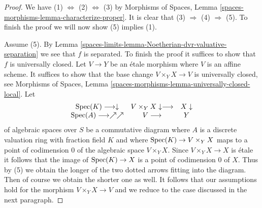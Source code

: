 \begin{proof}
We have (1) $\Leftrightarrow$ (2) $\Leftrightarrow$ (3) by
Morphisms of Spaces, Lemma \ref{spaces-morphisms-lemma-characterize-proper}.
It is clear that (3) $\Rightarrow$ (4) $\Rightarrow$ (5).
To finish the proof we will now show (5) implies (1).

\medskip\noindent
Assume (5). By Lemma \ref{spaces-limits-lemma-Noetherian-dvr-valuative-separation}
we see that $f$ is separated. To finish the proof it suffices to show
that $f$ is universally closed. Let $V \to Y$ be an \'etale morphism
where $V$ is an affine scheme. It suffices to show that the base
change $V \times_Y X \to V$ is universally closed, see
Morphisms of Spaces, Lemma
\ref{spaces-morphisms-lemma-universally-closed-local}.
Let
$$
\begin{array}{ccc}\operatorname{Spec}(K) \longrightarrow\downarrow & V \times_Y X \downarrow\longrightarrow & X \downarrow \\ \operatorname{Spec}(A) \longrightarrow\nearrow\nearrow & V \longrightarrow & Y\end{array}
$$
of algebraic spaces over $S$
be a commutative diagram where $A$ is a discrete valuation ring
with fraction field $K$ and where $\operatorname{Spec}(K) \to V \times_Y X$
maps to a point of codimension $0$ of the algebraic space
$V \times_Y X$. Since $V \times_Y X \to X$ is \'etale it follows
that the image of $\operatorname{Spec}(K) \to X$ is a point of codimension $0$
of $X$. Thus by (5) we obtain the longer of the two dotted
arrows fitting into the diagram. Then of course we obtain the
shorter one as well. It follows that our assumptions hold for
the morphism $V \times_Y X \to V$ and we reduce to the case discussed
in the next paragraph.


\end{proof}
